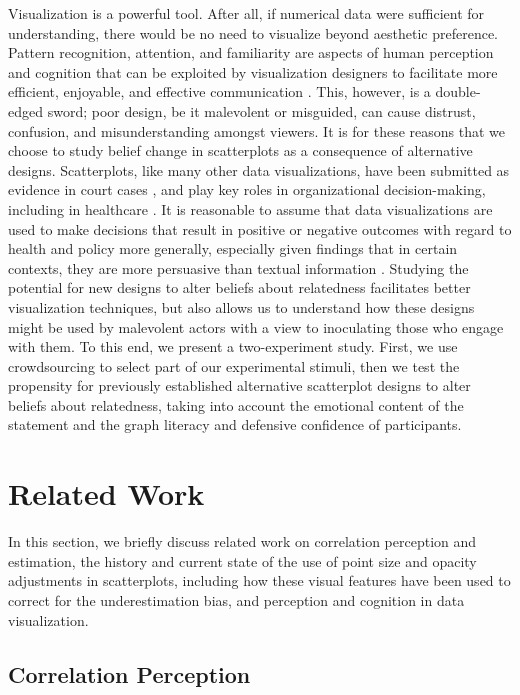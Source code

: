 \documentclass[manuscript,screen,review,anonymous]{acmart}
\begin{document}
Visualization is a powerful tool. After all, if numerical data were
sufficient for understanding, there would be no need to visualize beyond
aesthetic preference. Pattern recognition, attention, and familiarity
are aspects of human perception and cognition that can be exploited by
visualization designers to facilitate more efficient, enjoyable, and
effective communication \citep{franconeri_2021}. This, however, is a
double-edged sword; poor design, be it malevolent or misguided, can
cause distrust, confusion, and misunderstanding amongst viewers. It is
for these reasons that we choose to study belief change in scatterplots
as a consequence of alternative designs. Scatterplots, like many other
data visualizations, have been submitted as evidence in court cases
\citep{bobko_1979}, and play key roles in organizational
decision-making, including in healthcare \citep{poly_2019}. It is
reasonable to assume that data visualizations are used to make decisions
that result in positive or negative outcomes with regard to health and
policy more generally, especially given findings that in certain
contexts, they are more persuasive than textual information
\citep{pandey_2014}. Studying the potential for new designs to alter
beliefs about relatedness facilitates better visualization techniques,
but also allows us to understand how these designs might be used by
malevolent actors with a view to inoculating those who engage with them.
To this end, we present a two-experiment study. First, we use
crowdsourcing to select part of our experimental stimuli, then we test
the propensity for previously established alternative scatterplot
designs to alter beliefs about relatedness, taking into account the
emotional content of the statement and the graph literacy and defensive
confidence of participants.

\section{Related Work}\label{sec-rel-work-main}

In this section, we briefly discuss related work on correlation
perception and estimation, the history and current state of the use of
point size and opacity adjustments in scatterplots, including how these
visual features have been used to correct for the underestimation bias,
and perception and cognition in data visualization.

\subsection{Correlation Perception}\label{sec-corr-percept}
\end{document}
